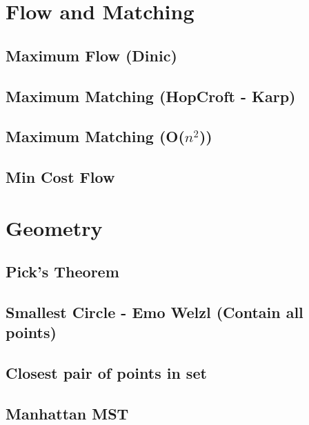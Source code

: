 \section{Flow and Matching}
\subsection{Maximum Flow (Dinic)}
\raggedbottom
\hrulefill
\subsection{Maximum Matching (HopCroft - Karp)}
\raggedbottom
\hrulefill
\subsection{Maximum Matching (O($n^2$))}
\raggedbottom
\hrulefill
\subsection{Min Cost Flow}
\raggedbottom
\hrulefill

\section{Geometry}
\subsection{Pick's Theorem}
\raggedbottom
\hrulefill
\subsection{Smallest Circle - Emo Welzl (Contain all points)}
\raggedbottom
\hrulefill
\subsection{Closest pair of points in set}
\raggedbottom
\hrulefill
\subsection{Manhattan MST}
\raggedbottom
\hrulefill


